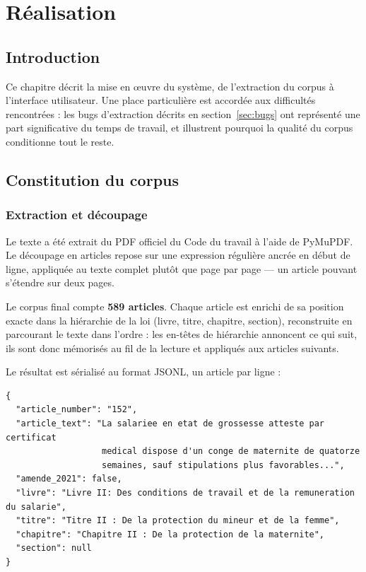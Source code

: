 \chapter{Réalisation}
\label{chap:realisation}

\section*{Introduction}

Ce chapitre décrit la mise en œuvre du système, de l'extraction du corpus à l'interface
utilisateur. Une place particulière est accordée aux difficultés rencontrées : les bugs
d'extraction décrits en section~\ref{sec:bugs} ont représenté une part significative du temps de
travail, et illustrent pourquoi la qualité du corpus conditionne tout le reste.

\section{Constitution du corpus}

\subsection{Extraction et découpage}

Le texte a été extrait du PDF officiel du Code du travail à l'aide de PyMuPDF. Le découpage en
articles repose sur une expression régulière ancrée en début de ligne, appliquée au texte complet
plutôt que page par page --- un article pouvant s'étendre sur deux pages.

Le corpus final compte \textbf{589 articles}. Chaque article est enrichi de sa position exacte
dans la hiérarchie de la loi (livre, titre, chapitre, section), reconstruite en parcourant le
texte dans l'ordre : les en-têtes de hiérarchie annoncent ce qui suit, ils sont donc mémorisés au
fil de la lecture et appliqués aux articles suivants.

Le résultat est sérialisé au format JSONL, un article par ligne :

\begin{lstlisting}[style=mystyle,caption={Structure d'un article du corpus},captionpos=b]
{
  "article_number": "152",
  "article_text": "La salariee en etat de grossesse atteste par certificat
                   medical dispose d'un conge de maternite de quatorze
                   semaines, sauf stipulations plus favorables...",
  "amende_2021": false,
  "livre": "Livre II: Des conditions de travail et de la remuneration du salarie",
  "titre": "Titre II : De la protection du mineur et de la femme",
  "chapitre": "Chapitre II : De la protection de la maternite",
  "section": null
}
\end{lstlisting}

